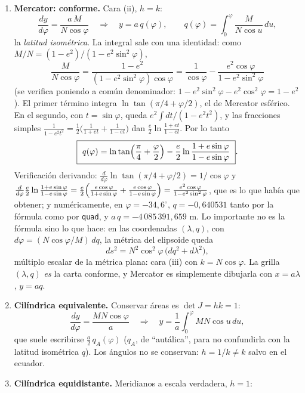 \begin{enumerate}[label=(\alph*)]
  \item \textbf{Mercator: conforme.} Cara (ii), \(h=k\):
  \[
    \frac{dy}{d\varphi}=\frac{a\,M}{N\cos\varphi}
    \quad\Longrightarrow\quad
    y=a\,q(\varphi),\qquad
    q(\varphi)=\int_0^\varphi\frac{M}{N\cos u}\,du ,
  \]
  la \emph{latitud isométrica}. La integral sale con una identidad: como
  \(M/N=(1-e^2)/(1-e^2\sin^2\varphi)\),
  \[
    \frac{M}{N\cos\varphi}=\frac{1-e^2}{(1-e^2\sin^2\varphi)\cos\varphi}
    =\frac1{\cos\varphi}-\frac{e^2\cos\varphi}{1-e^2\sin^2\varphi}
  \]
  (se verifica poniendo a común denominador: \(1-e^2\sin^2\varphi-e^2\cos^2\varphi=1-e^2\)).
  El primer término integra \(\ln\tan(\pi/4+\varphi/2)\), el de Mercator esférico. En el
  segundo, con \(t=\sin\varphi\), queda \(e^2\int dt/(1-e^2t^2)\), y las fracciones simples
  \(\frac1{1-e^2t^2}=\frac12\bigl(\frac1{1+et}+\frac1{1-et}\bigr)\) dan
  \(\frac e2\ln\frac{1+et}{1-et}\). Por lo tanto
  \[
    \boxed{\ q(\varphi)=\ln\tan\Bigl(\frac\pi4+\frac\varphi2\Bigr)
    -\frac e2\ln\frac{1+e\sin\varphi}{1-e\sin\varphi}\ } .
  \]
  Verificación derivando: \(\frac{d}{d\varphi}\ln\tan(\pi/4+\varphi/2)=1/\cos\varphi\) y
  \(\frac{d}{d\varphi}\frac e2\ln\frac{1+e\sin\varphi}{1-e\sin\varphi}
  =\frac e2\Bigl(\frac{e\cos\varphi}{1+e\sin\varphi}+\frac{e\cos\varphi}{1-e\sin\varphi}\Bigr)
  =\frac{e^2\cos\varphi}{1-e^2\sin^2\varphi}\), que es lo que había que obtener; y
  numéricamente, en \(\varphi=-34{,}6^\circ\), \(q=-0{,}640531\) tanto por la fórmula como
  por \texttt{quad}, y \(a\,q=-4\,085\,391{,}659\) m.
  Lo importante no es la fórmula sino lo que hace: en las coordenadas \((\lambda,q)\), con
  \(d\varphi=(N\cos\varphi/M)\,dq\), la métrica del elipsoide queda
  \[
    ds^2=N^2\cos^2\varphi\,\bigl(dq^2+d\lambda^2\bigr),
  \]
  múltiplo escalar de la métrica plana: cara (iii) con \(k=N\cos\varphi\). La grilla
  \((\lambda,q)\) \emph{es} la carta conforme, y Mercator es simplemente dibujarla con
  \(x=a\lambda\), \(y=aq\).
  \item \textbf{Cilíndrica equivalente.} Conservar áreas es \(\det J=hk=1\):
  \[
    \frac{dy}{d\varphi}=\frac{MN\cos\varphi}{a}\quad\Longrightarrow\quad
    y=\frac1a\int_0^\varphi MN\cos u\,du ,
  \]
  que suele escribirse \(\tfrac a2\,q_A(\varphi)\) (\(q_A\), de \enquote{autálica}, para no
  confundirla con la latitud isométrica \(q\)). Los ángulos no se conservan: \(h=1/k\neq k\) salvo en el
  ecuador.
  \item \textbf{Cilíndrica equidistante.} Meridianos a escala verdadera, \(h=1\):

\end{enumerate}
